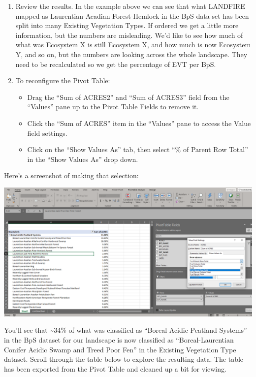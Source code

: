 \documentclass[
]{book}
\providecommand{\tightlist}{%
  \setlength{\itemsep}{0pt}\setlength{\parskip}{0pt}}
\begin{document}
\begin{enumerate}
\def\labelenumi{\arabic{enumi}.}
\setcounter{enumi}{1}
\tightlist
\item
  Review the results. In the example above we can see that what LANDFIRE mapped as Laurentian-Acadian Forest-Hemlock in the BpS data set has been split into many Existing Vegetation Types. If ordered we get a little more information, but the numbers are misleading. We'd like to see how much of what was Ecosystem X is still Ecosystem X, and how much is now Ecosystem Y, and so on, but the numbers are looking across the whole landscape. They need to be recalculated so we get the percentage of EVT per BpS.
\item
  To reconfigure the Pivot Table:

  \begin{itemize}
  \tightlist
  \item
    Drag the ``Sum of ACRES2'' and ``Sum of ACRES3'' field from the ``Values'' pane up to the Pivot Table Fields to remove it.
  \item
    Click the ``Sum of ACRES'' item in the ``Values'' pane to access the Value field settings.
  \item
    Click on the ``Show Values As'' tab, then select ``\% of Parent Row Total'' in the ``Show Values As'' drop down.
  \end{itemize}
\end{enumerate}

Here's a screenshot of making that selection:

\includegraphics[width=1\linewidth]{pivotPercentParent}

You'll see that \textasciitilde34\% of what was classified as ``Boreal Acidic Peatland Systems'' in the BpS dataset for our landscape is now classified as ``Boreal-Laurentian Conifer Acidic Swamp and Treed Poor Fen'' in the Existing Vegetation Type dataset. Scroll through the table below to explore the resulting data. The table has been exported from the Pivot Table and cleaned up a bit for viewing.
\end{document}

